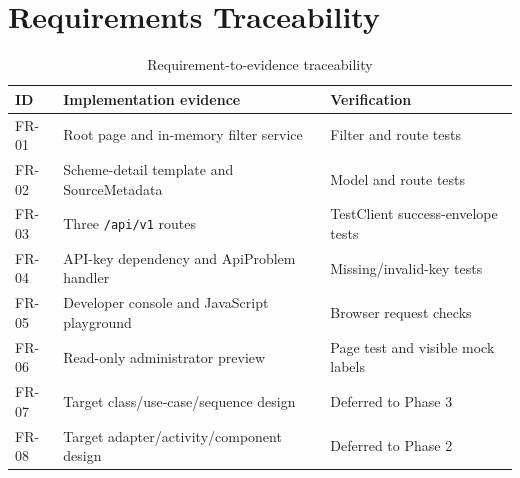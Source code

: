 \documentclass{tietreport}
\begin{document}
\chapter{Requirements Traceability}
\begin{table}[H]
\centering
\begin{tabularx}{\textwidth}{@{}p{1.5cm}XX@{}}
\toprule
\textbf{ID} & \textbf{Implementation evidence} & \textbf{Verification} \\
\midrule
FR-01 & Root page and in-memory filter service & Filter and route tests \\
FR-02 & Scheme-detail template and SourceMetadata & Model and route tests \\
FR-03 & Three \texttt{/api/v1} routes & TestClient success-envelope tests \\
FR-04 & API-key dependency and ApiProblem handler & Missing/invalid-key tests \\
FR-05 & Developer console and JavaScript playground & Browser request checks \\
FR-06 & Read-only administrator preview & Page test and visible mock labels \\
FR-07 & Target class/use-case/sequence design & Deferred to Phase 3 \\
FR-08 & Target adapter/activity/component design & Deferred to Phase 2 \\
\bottomrule
\end{tabularx}
\caption{Requirement-to-evidence traceability}
\label{tab:traceability}
\end{table}

\printbibliography[heading=bibintoc]
\end{document}
